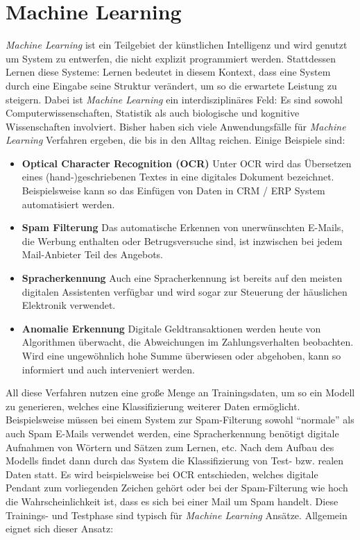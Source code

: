 \section{Machine Learning}

\textit{Machine Learning} ist ein Teilgebiet der künstlichen Intelligenz und wird genutzt um System zu entwerfen, die nicht explizit programmiert werden. Stattdessen Lernen diese Systeme: Lernen bedeutet in diesem Kontext, dass eine System durch eine Eingabe seine Struktur verändert, um so die erwartete Leistung zu steigern. Dabei ist \textit{Machine Learning} ein interdisziplinäres Feld: Es sind sowohl Computerwissenschaften, Statistik als auch biologische und kognitive Wissenschaften involviert. Bisher haben sich viele Anwendungsfälle für \textit{Machine Learning} Verfahren ergeben, die bis in den Alltag reichen. Einige Beispiele sind:

\begin{itemize}
	\item \textbf{Optical Character Recognition (OCR)} Unter OCR wird das Übersetzen eines (hand-)geschriebenen Textes in eine digitales Dokument bezeichnet. Beispielsweise kann so das Einfügen von Daten in CRM / ERP System automatisiert werden.
	\item \textbf{Spam Filterung} Das automatische Erkennen von unerwünschten E-Mails, die Werbung enthalten oder Betrugsversuche sind, ist inzwischen bei jedem Mail-Anbieter Teil des Angebots.
	\item \textbf{Spracherkennung} Auch eine Spracherkennung ist bereits auf den meisten digitalen Assistenten verfügbar und wird sogar zur Steuerung der häuslichen Elektronik verwendet.
	\item \textbf{Anomalie Erkennung} Digitale Geldtransaktionen werden heute von Algorithmen überwacht, die Abweichungen im Zahlungsverhalten beobachten. Wird eine ungewöhnlich hohe Summe überwiesen oder abgehoben, kann so informiert und auch interveniert werden.
\end{itemize}

All diese Verfahren nutzen eine große Menge an Trainingsdaten, um so ein Modell zu generieren, welches eine Klassifizierung weiterer Daten ermöglicht. Beispielsweise müssen bei einem System zur Spam-Filterung sowohl \enquote{normale} als auch Spam E-Mails verwendet werden, eine Spracherkennung benötigt digitale Aufnahmen von Wörtern und Sätzen zum Lernen, etc.
Nach dem Aufbau des Modells findet dann durch das System die Klassifizierung von Test- bzw. realen Daten statt. Es wird beispielsweise bei OCR entschieden, welches digitale Pendant zum vorliegenden Zeichen gehört oder bei der Spam-Filterung wie hoch die Wahrscheinlichkeit ist, dass es sich bei einer Mail um Spam handelt. Diese Trainings- und Testphase sind typisch für \textit{Machine Learning} Ansätze. Allgemein eignet sich dieser Ansatz:

